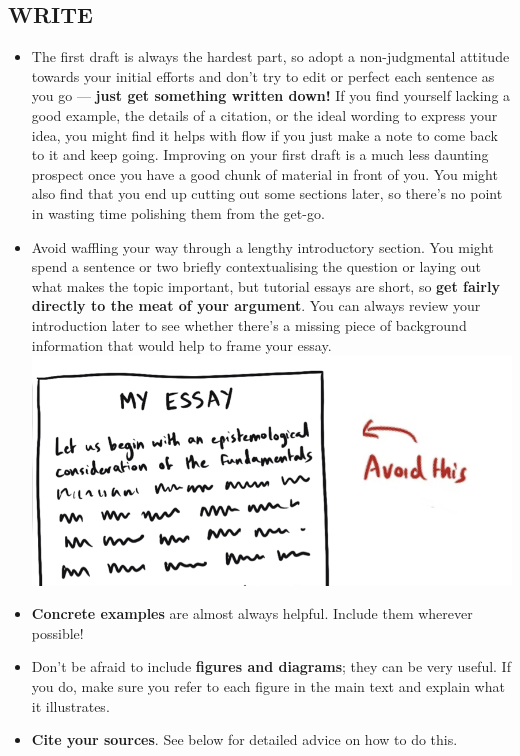 \documentclass[10pt,a4paper]{article}
\begin{document}
\begin{multicols}{2}
\section*{WRITE}

\begin{itemize}

\item The first draft is always the hardest part, so adopt a non-judgmental attitude towards your initial efforts and don’t try to edit or perfect each sentence as you go --- \textbf{just get something written down!} If you find yourself lacking a good example, the details of a citation, or the ideal wording to express your idea, you might find it helps with flow if you just make a note to come back to it and keep going. Improving on your first draft is a much less daunting prospect once you have a good chunk of material in front of you. You might also find that you end up cutting out some sections later, so there’s no point in wasting time polishing them from the get-go.
\item Avoid waffling your way through a lengthy introductory section. You might spend a sentence or two briefly contextualising the question or laying out what makes the topic important, but tutorial essays are short, so \textbf{get fairly directly to the meat of your argument}. You can always review your introduction later to see whether there’s a missing piece of background information that would help to frame your essay.
\hspace{0.2\columnwidth}
  \includegraphics[width=0.8\columnwidth]{cartoons/how-not-to-introduction.png}
\item \textbf{Concrete examples} are almost always helpful. Include them wherever possible!
\item Don’t be afraid to include \textbf{figures and diagrams}; they can be very useful. If you do, make sure you refer to each figure in the main text and explain what it illustrates.
\item \textbf{Cite your sources}. See below for detailed advice on how to do this.


\end{itemize}
\end{multicols}
\end{document}
